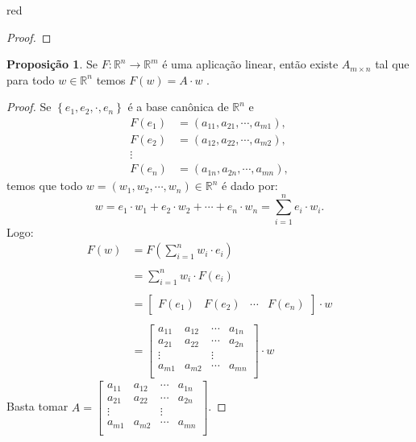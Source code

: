 \documentclass[12pt,leqno,twoside]{amsart}
\theoremstyle{definition}
\newtheorem{proposicao}{Proposição}[section]
\begin{document}
\begin{color}{red}
\begin{proof}
\end{proof}

\vspace{0.3cm}

\begin{proposicao}
	\label{prop:linap}
	Se $F:\mathbb{R}^n \to \mathbb{R}^m$ é uma aplicação linear, então existe $A_{m\times n}$ tal que para todo $w\in \mathbb{R}^n$ temos $F(w) = A\cdot w$ .
\end{proposicao}
\begin{proof}
	Se $\left\{e_1,e_2,\cdot, e_n\right\}$ é a base canônica de $\mathbb{R}^n$ e
	\begin{align*}
		F(e_1) &= (a_{11}, a_{21}, \cdots, a_{m1}),\\
		F(e_2) &= (a_{12}, a_{22}, \cdots, a_{m2}),\\
		\vdots  \\
		F(e_n) &= (a_{1n}, a_{2n}, \cdots, a_{mn}),
	\end{align*}
	temos que todo $w = (w_1,w_2,\cdots,w_n) \in \mathbb{R}^n$ é dado por:
	$$
	w = e_1\cdot w_1+e_2\cdot w_2+\cdots +e_n\cdot w_n = \sum_{i=1}^n e_i\cdot w_i.
	$$
	Logo:
	\begin{align*}
		F(w) &=F\left( \displaystyle\sum_{i=1}^n w_i\cdot e_i\right) \\~\\
		&= \displaystyle\sum_{i=1}^n w_i\cdot F(e_i) \\~\\
		&= \left[\begin{array}{cccc} F(e_1)& F(e_2)& \cdots& F(e_n)  \end{array} \right]\cdot w  \\~\\
			&= \left[\begin{array}{cccc} a_{11}& a_{12}& \cdots& a_{1n} \\ a_{21}& a_{22}& \cdots& a_{2n} \\ \vdots &&\vdots&\\ a_{m1}& a_{m2}& \cdots& a_{mn} \\  \end{array} \right]\cdot w
	\end{align*}
	Basta tomar $A=\left[\begin{array}{cccc} a_{11}& a_{12}& \cdots& a_{1n} \\ a_{21}& a_{22}& \cdots& a_{2n} \\ \vdots &&\vdots&\\ a_{m1}& a_{m2}& \cdots& a_{mn} \\  \end{array} \right]$.
\end{proof}


\end{color}
\end{document}
